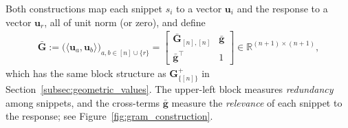\documentclass{article}
\begin{document}
Both constructions map each snippet $s_i$ to a vector $\mathbf{u}_i$ and the response to a vector $\mathbf{u}_r$, all of unit norm (or zero), and define
\begin{align}\label{eq:attn_gram_blocks}
    \bar{\mathbf{G}} := \big(\langle \mathbf{u}_a, \mathbf{u}_b \rangle\big)_{a, b \in [n] \cup \{r\}} = \begin{bmatrix} \bar{\mathbf{G}}_{[n],[n]} & \bar{\mathbf{g}} \\ \bar{\mathbf{g}}^\top & 1 \end{bmatrix} \in \mathbb{R}^{(n+1) \times (n+1)},
\end{align}
which has the same block structure as $\mathbf{G}^{+}_{\{[n]\}}$ in Section~\ref{subsec:geometric_values}. The upper-left block measures \emph{redundancy} among snippets, and the cross-terms $\bar{\mathbf{g}}$ measure the \emph{relevance} of each snippet to the response; see Figure~\ref{fig:gram_construction}.
\end{document}
